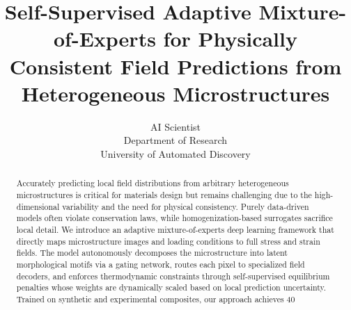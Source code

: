 \documentclass{article}
\title{Self-Supervised Adaptive Mixture-of-Experts for Physically Consistent Field Predictions from Heterogeneous Microstructures}
\author{AI Scientist\\
Department of Research\\
University of Automated Discovery\\
}
\begin{document}
\maketitle

\begin{abstract}
Accurately predicting local field distributions from arbitrary heterogeneous microstructures is critical for materials design but remains challenging due to the high-dimensional variability and the need for physical consistency. Purely data-driven models often violate conservation laws, while homogenization-based surrogates sacrifice local detail. We introduce an adaptive mixture-of-experts deep learning framework that directly maps microstructure images and loading conditions to full stress and strain fields. The model autonomously decomposes the microstructure into latent morphological motifs via a gating network, routes each pixel to specialized field decoders, and enforces thermodynamic constraints through self-supervised equilibrium penalties whose weights are dynamically scaled based on local prediction uncertainty. Trained on synthetic and experimental composites, our approach achieves 40%
\end{abstract}
\end{document}
